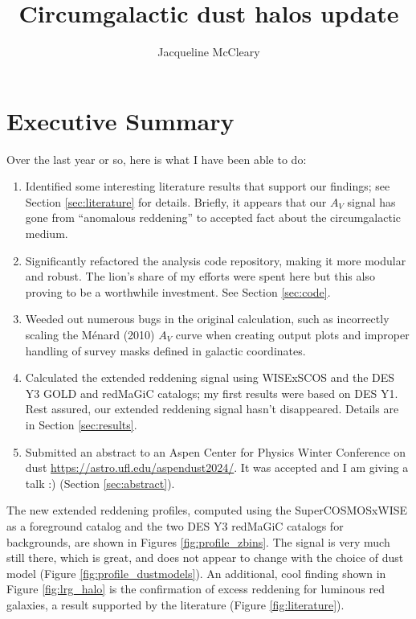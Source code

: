 \documentclass[11pt, oneside]{article}   	%
\title{Circumgalactic dust halos update}
\author{Jacqueline McCleary}
\begin{document}
\maketitle


\section{Executive Summary}

Over the last year or so, here is what I have been able to do: 
\begin{enumerate}
\item Identified some interesting literature results that support our findings; see Section \ref{sec:literature} for details. Briefly, it appears that our $A_V$ signal has gone from ``anomalous reddening'' to accepted fact about the circumgalactic medium.
\item Significantly refactored the analysis code repository, making it more modular and robust. The lion's share of my efforts were spent here but this also proving to be a worthwhile investment. See Section \ref{sec:code}.
\item Weeded out numerous bugs in the original calculation, such as incorrectly scaling the M\'{e}nard (2010) $A_V$ curve when creating output plots and improper handling of survey masks defined in galactic coordinates. 
\item Calculated the extended reddening signal using WISExSCOS and the DES Y3 GOLD and redMaGiC catalogs; my first results were based on DES Y1. Rest assured, our extended reddening signal hasn't disappeared. Details are in Section \ref{sec:results}.
\item Submitted an abstract to an Aspen Center for Physics Winter Conference on dust \url{https://astro.ufl.edu/aspendust2024/}. It was accepted and I am giving a talk :) (Section \ref{sec:abstract}). 
\end{enumerate}

The new extended reddening profiles, computed using the SuperCOSMOSxWISE as a foreground catalog and the two DES Y3 redMaGiC catalogs for backgrounds, are shown in Figures \ref{fig:profile_zbins}. The signal is very much still there, which is great, and does not appear to change with the choice of dust model (Figure \ref{fig:profile_dustmodels}). An additional, cool finding shown in Figure \ref{fig:lrg_halo} is the confirmation of excess reddening for luminous red galaxies, a result supported by the literature (Figure \ref{fig:literature}). 
\end{document}
